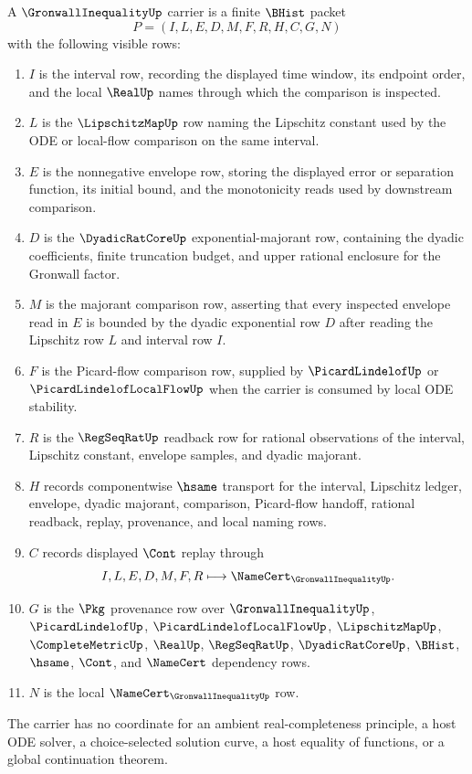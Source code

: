 \begin{definition}
\label{def:gronwall-inequality-carrier}
A $\GronwallInequalityUp$ carrier is a finite $\BHist$ packet
$$
P=(I,L,E,D,M,F,R,H,C,G,N)
$$
with the following visible rows:
\begin{enumerate}
\item $I$ is the interval row, recording the displayed time window, its endpoint order, and the local $\RealUp$ names through which the comparison is inspected.
\item $L$ is the $\LipschitzMapUp$ row naming the Lipschitz constant used by the ODE or local-flow comparison on the same interval.
\item $E$ is the nonnegative envelope row, storing the displayed error or separation function, its initial bound, and the monotonicity reads used by downstream comparison.
\item $D$ is the $\DyadicRatCoreUp$ exponential-majorant row, containing the dyadic coefficients, finite truncation budget, and upper rational enclosure for the Gronwall factor.
\item $M$ is the majorant comparison row, asserting that every inspected envelope read in $E$ is bounded by the dyadic exponential row $D$ after reading the Lipschitz row $L$ and interval row $I$.
\item $F$ is the Picard-flow comparison row, supplied by $\PicardLindelofUp$ or $\PicardLindelofLocalFlowUp$ when the carrier is consumed by local ODE stability.
\item $R$ is the $\RegSeqRatUp$ readback row for rational observations of the interval, Lipschitz constant, envelope samples, and dyadic majorant.
\item $H$ records componentwise $\hsame$ transport for the interval, Lipschitz ledger, envelope, dyadic majorant, comparison, Picard-flow handoff, rational readback, replay, provenance, and local naming rows.
\item $C$ records displayed $\Cont$ replay through
$$
I,L,E,D,M,F,R \longmapsto \NameCert_{\GronwallInequalityUp}.
$$
\item $G$ is the $\Pkg$ provenance row over $\GronwallInequalityUp$, $\PicardLindelofUp$, $\PicardLindelofLocalFlowUp$, $\LipschitzMapUp$, $\CompleteMetricUp$, $\RealUp$, $\RegSeqRatUp$, $\DyadicRatCoreUp$, $\BHist$, $\hsame$, $\Cont$, and $\NameCert$ dependency rows.
\item $N$ is the local $\NameCert_{\GronwallInequalityUp}$ row.
\end{enumerate}
The carrier has no coordinate for an ambient real-completeness principle, a host ODE solver, a choice-selected solution curve, a host equality of functions, or a global continuation theorem.
\end{definition}

